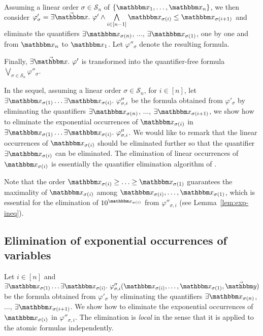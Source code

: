 Assuming a linear order $\sigma \in \mathcal{S}_n$ of $\{\ivarx_1,\ldots, \ivarx_n\}$, we then consider $\varphi'_\sigma  = \exists \vec{\ivarx}.\ \varphi' \wedge \bigwedge \limits_{i \in [n-1]} \ivarx_{\sigma(i)} \le \ivarx_{\sigma(i+1)}$ and eliminate the quantifiers $\exists \ivarx_{\sigma(n)}$, $\ldots$, $\exists \ivarx_{\sigma(1)}$,  one by one and from $\ivarx_n$ to $\ivarx_1$. Let $\varphi''_\sigma$ denote the resulting formula.

Finally, $\exists \vec{\ivarx}.\ \varphi'$ is transformed into the quantifier-free formula $\bigvee \limits_{\sigma \in \mathcal{S}_n} \varphi''_{\sigma}$. 

In the sequel, assuming a linear order $\sigma \in \mathcal{S}_n$, for $i \in [n]$, let $\exists \ivarx_{\sigma(1)} \ldots \exists \ivarx_{\sigma(i)}.\ \varphi''_{\sigma,i}$ be the formula obtained from $\varphi'_\sigma$ by eliminating the quantifiers $\exists \ivarx_{\sigma(n)}$, $\ldots$, $\exists \ivarx_{\sigma(i+1)}$, we show how to eliminate the exponential occurrences of $\ivarx_{\sigma(i)}$ in $\exists \ivarx_{\sigma(1)} \ldots \exists \ivarx_{\sigma(i)}.\ \varphi''_{\sigma,i}$. We would like to remark that the linear occurrences of $\ivarx_{\sigma(i)}$ should be eliminated further so that the quantifier $\exists \ivarx_{\sigma(i)}$ can be eliminated. The elimination of linear occurrences of $\ivarx_{\sigma(i)}$ is essentially the quantifier elimination algorithm of {\pa}.

Note that the order $\ivarx_{\sigma(i)} \ge \ldots \ge \ivarx_{\sigma(1)}$ guarantees the maximality of $\ivarx_{\sigma(i)}$ among $\ivarx_{\sigma(i)}, \ldots, \ivarx_{\sigma(1)}$, which is essential for the elimination of $10^{\ivarx_{\sigma(i)}}$ from $\varphi''_{\sigma,i}$ (see Lemma~\ref{lem:exp-ineq}).


\vspace*{-3mm}
\subsection{Elimination of  exponential occurrences of variables}\label{sec-elim-exp}

Let $i \in [n]$ and $\exists \ivarx_{\sigma(1)} \ldots \exists \ivarx_{\sigma(i)}.\ \varphi''_{\sigma,i}(\ivarx_{\sigma(i)}, \ldots, \ivarx_{\sigma(1)}, \vec{\ivary})$ be the formula obtained from $\varphi'_\sigma$ by eliminating the quantifiers $\exists \ivarx_{\sigma(n)}$, $\ldots$, $\exists \ivarx_{\sigma(i+1)}$. We show how to eliminate the exponential occurrences of $\ivarx_{\sigma(i)}$ in $\varphi''_{\sigma,i}$. The elimination is \emph{local} in the sense that it is applied to the atomic formulas independently. 

